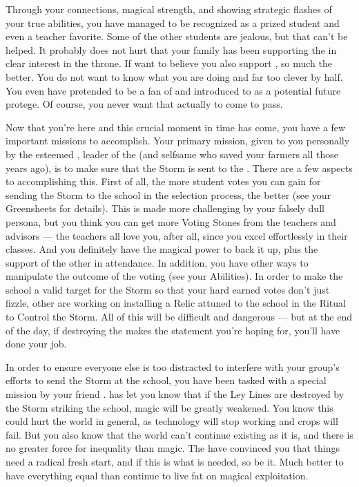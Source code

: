 \documentclass[char]{GL2020}
\begin{document}
Through your connections, magical strength, and showing strategic flashes of your true abilities, you have managed to be recognized as a prized student and even a teacher favorite. 
Some of the other students are jealous, but that can't be helped. It probably does not hurt that your family has been supporting the \cPrince{\full} in \cPrince{\their} clear interest in the throne. If \cPrince{\they} want\cPrince{\verbs} to believe you also support \cPrince{\them}, so much the better. You do not want \cPrince{} to know what you are doing and \cPrince{\theyare} far too clever by half. You even have pretended to be a fan of \cPrince{} and introduced \cAmbition{} to \cPrince{\them} as a potential future protege. Of course, you never want that actually to come to pass.
 
Now that you're here and this crucial moment in time has come, you have a few important missions to accomplish. Your primary mission, given to you personally by the esteemed \cChupLeader{\full}, leader of the \pGoaties{} (and selfsame \cChupLeader{\person} who saved your farmers all those years ago), is to make sure that the Storm is sent to the \pSc{}. There are a few aspects to accomplishing this. First of all, the more student votes you can gain for sending the Storm to the school in the selection process, the better (see your Greensheets for details). This is made more challenging by your falsely dull persona, but you think you can get more Voting Stones from the teachers and advisors — the teachers all love you, after all, since you excel effortlessly in their classes. And you definitely have the magical power to back it up, plus the support of the other \pGoaties{} in attendance. In addition, you have other ways to manipulate the outcome of the voting (see your Abilities). In order to make the school a valid target for the Storm so that your hard earned votes don't just fizzle, other \pGoaties{} are working on installing a Relic attuned to the school in the Ritual to Control the Storm. All of this will be difficult and dangerous — but at the end of the day, if destroying the \pSchool{} makes the statement you're hoping for, you'll have done your job.
 
In order to ensure everyone else is too distracted to interfere with your group's efforts to send the Storm at the school, you have been tasked with a special mission by your friend \cChupSecond{}. \cChupLeader{} has let you know that if the Ley Lines are destroyed by the Storm striking the school, magic will be greatly weakened. You know this could hurt the world in general, as technology will stop working and crops will fail. But you also know that the world can’t continue existing as it is, and there is no greater force for inequality than magic. The \pGoaties{} have convinced you that things need a radical fresh start, and if this is what is needed, so be it. Much better to have everything equal than continue to live fat on magical exploitation.  
\end{document}
